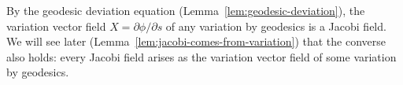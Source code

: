 












\begin{colremark}{}{}
By the geodesic deviation equation (Lemma~\ref{lem:geodesic-deviation}), the variation vector field $X = \partial \phi/\partial s$ of any variation by geodesics is a Jacobi field. We will see later (Lemma~\ref{lem:jacobi-comes-from-variation}) that the converse also holds: every Jacobi field arises as the variation vector field of some variation by geodesics.
\end{colremark}

